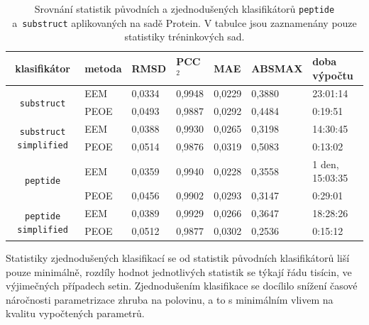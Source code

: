 \begin{table}[h]
    \renewcommand{\arraystretch}{1.4}
    \centering
    \begin{tabular}{c|l|l|l|l|l|l}
         \textbf{klasifikátor} &  \textbf{metoda} & \textbf{RMSD} & \textbf{PCC$^2$} & \textbf{MAE} & \textbf{ABSMAX} & \textbf{doba výpočtu}\\
         \hline
         \multirow{2}{6em}{\texttt{substruct}} & EEM & 0,0334 & 0,9948 & 0,0229 & 0,3880 & 23:01:14  \\
         & PEOE & 0,0493 & 0,9887 & 0,0292 & 0,4484 & 0:19:51 \\
         \hline
         \multirow{2}{6em}{\texttt{substruct simplified}} & EEM & 0,0388 & 0,9930 & 0,0265 & 0,3198 & 14:30:45 \\
         & PEOE & 0,0514 & 0,9876 & 0,0319 & 0,5083 & 0:13:02 \\
         \hline
         \multirow{2}{6em}{\texttt{peptide}} & EEM & 0,0359 & 0,9940 & 0,0228 & 0,3558 & 1 den, 15:03:35 \\
         & PEOE & 0,0456 & 0,9902 & 0,0293 & 0,3147 & 0:29:01 \\
         \hline
         \multirow{2}{6em}{\texttt{peptide simplified}} & EEM & 0,0389 & 0,9929 & 0,0266 & 0,3647 & 18:28:26 \\
         & PEOE & 0,0512 & 0,9877 & 0,0302 & 0,2536 & 0:15:12
    \end{tabular}
    \caption{Srovnání statistik původních a zjednodušených klasifikátorů \texttt{peptide} a~\texttt{substruct} aplikovaných na sadě Protein. V tabulce jsou zaznamenány pouze statistiky tréninkových sad.}
    \label{statistics_simplified}
\end{table}

Statistiky zjednodušených klasifikací se od statistik původních klasifikátorů liší pou\-ze minimálně, rozdíly hodnot jednotlivých statistik se týkají řádu tisícin, ve výjimečných případech setin. Zjednodušením klasifikace se docílilo snížení časové náročnosti parametrizace zhruba na polovinu, a to s minimálním vlivem na kvalitu vypočtených parametrů.


